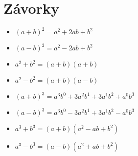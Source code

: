 \documentclass[main.tex]{subfiles}
\begin{document}
\section*{Závorky}
\begin{multicols}{2}
  \begin{itemize}
    \item $(a+b)^2 =a^2 + 2ab + b^2$
    \item $(a-b)^2 =a^2 - 2ab + b^2$
    \item $a^2 + b^2=(a+b)(a+b)$
    \item $a^2 - b^2=(a+b)(a-b)$
\columnbreak
    \item $(a+b)^3 =a^3 b^0 +3a^2 b^1 +3a^1 b^2 + a^0 b^3$
    \item $(a-b)^3 =a^3 b^0 -3a^2 b^1 +3a^1 b^2 - a^0 b^3$
    \item $a^3 + b^3 =(a+b)(a^2 - ab + b^2 )$
    \item $a^3 - b^3 =(a-b)(a^2 + ab + b^2 )$
  \end{itemize}
\end{multicols}
\end{document}
